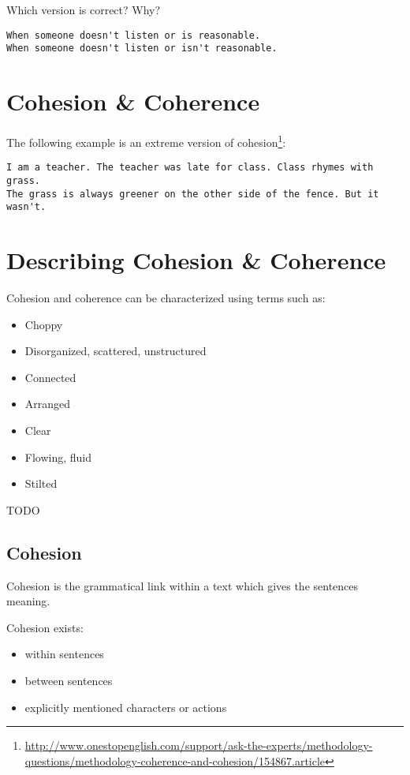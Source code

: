 \documentclass[10pt,a4paper]{book}
\begin{document}


Which version is correct? Why?
\begin{verbatim}
When someone doesn't listen or is reasonable.
When someone doesn't listen or isn't reasonable.
\end{verbatim}


\section{Cohesion \& Coherence}

The following example is an extreme version of cohesion\footnote{\url{http://www.onestopenglish.com/support/ask-the-experts/methodology-questions/methodology-coherence-and-cohesion/154867.article}}:
\begin{verbatim}
I am a teacher. The teacher was late for class. Class rhymes with grass.
The grass is always greener on the other side of the fence. But it wasn't.
\end{verbatim}


\section{Describing Cohesion \& Coherence}

Cohesion and coherence can be characterized using terms such as:
\begin{itemize}
    \itemsep1pt\parskip0pt
    \item Choppy
    \item Disorganized, scattered, unstructured
    \item Connected
    \item Arranged
    \item Clear
    \item Flowing, fluid
    \item Stilted
\end{itemize}

\color{BrickRed}TODO\color{black}


\subsection{Cohesion}

Cohesion is the grammatical link within a text which gives the sentences meaning.

Cohesion exists:
\begin{itemize}
    \itemsep1pt\parskip0pt
    \item within sentences
    \item between sentences
    \item explicitly mentioned characters or actions
\end{itemize}
\end{document}
